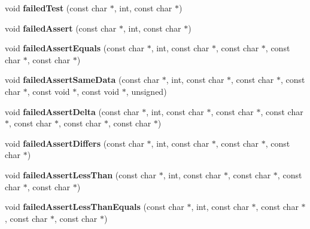 \begin{DoxyCompactItemize}
\item 
\hypertarget{classCxxTest_1_1GuiListener_a934da17a6624e733745562b928590726}{void {\bfseries failed\-Test} (const char $\ast$, int, const char $\ast$)}\label{classCxxTest_1_1GuiListener_a934da17a6624e733745562b928590726}

\item 
\hypertarget{classCxxTest_1_1GuiListener_ab088e0e9d22d61af2f5eff77af1ffa1a}{void {\bfseries failed\-Assert} (const char $\ast$, int, const char $\ast$)}\label{classCxxTest_1_1GuiListener_ab088e0e9d22d61af2f5eff77af1ffa1a}

\item 
\hypertarget{classCxxTest_1_1GuiListener_a5ee691eb3462793bb370f397e6db502a}{void {\bfseries failed\-Assert\-Equals} (const char $\ast$, int, const char $\ast$, const char $\ast$, const char $\ast$, const char $\ast$)}\label{classCxxTest_1_1GuiListener_a5ee691eb3462793bb370f397e6db502a}

\item 
\hypertarget{classCxxTest_1_1GuiListener_a42ec7327e3b81ff2847887263a8686d7}{void {\bfseries failed\-Assert\-Same\-Data} (const char $\ast$, int, const char $\ast$, const char $\ast$, const char $\ast$, const void $\ast$, const void $\ast$, unsigned)}\label{classCxxTest_1_1GuiListener_a42ec7327e3b81ff2847887263a8686d7}

\item 
\hypertarget{classCxxTest_1_1GuiListener_abd040295d5b006d5c8bd228a1175ea36}{void {\bfseries failed\-Assert\-Delta} (const char $\ast$, int, const char $\ast$, const char $\ast$, const char $\ast$, const char $\ast$, const char $\ast$, const char $\ast$)}\label{classCxxTest_1_1GuiListener_abd040295d5b006d5c8bd228a1175ea36}

\item 
\hypertarget{classCxxTest_1_1GuiListener_aa0481d28bfa527d28486641fc75666b6}{void {\bfseries failed\-Assert\-Differs} (const char $\ast$, int, const char $\ast$, const char $\ast$, const char $\ast$)}\label{classCxxTest_1_1GuiListener_aa0481d28bfa527d28486641fc75666b6}

\item 
\hypertarget{classCxxTest_1_1GuiListener_aa72f9a3da67bb859d3c84b9730bfc7c0}{void {\bfseries failed\-Assert\-Less\-Than} (const char $\ast$, int, const char $\ast$, const char $\ast$, const char $\ast$, const char $\ast$)}\label{classCxxTest_1_1GuiListener_aa72f9a3da67bb859d3c84b9730bfc7c0}

\item 
\hypertarget{classCxxTest_1_1GuiListener_aec6bf0a46fd0c5480bfb9ad914a8ac68}{void {\bfseries failed\-Assert\-Less\-Than\-Equals} (const char $\ast$, int, const char $\ast$, const char $\ast$, const char $\ast$, const char $\ast$)}\label{classCxxTest_1_1GuiListener_aec6bf0a46fd0c5480bfb9ad914a8ac68}


\end{DoxyCompactItemize}
